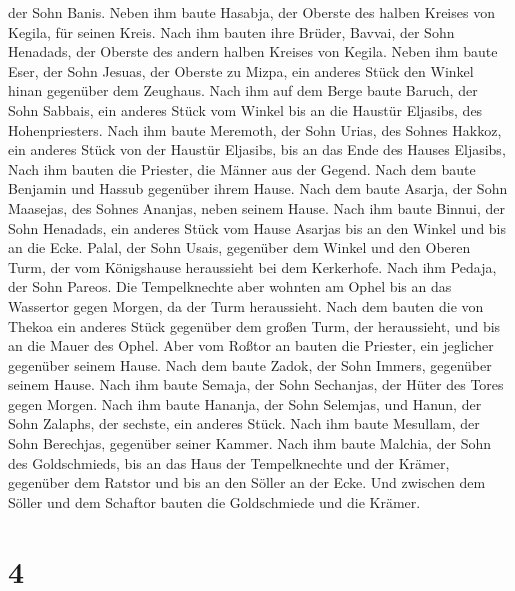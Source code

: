 der Sohn Banis. Neben ihm baute Hasabja, der Oberste des halben Kreises
von Kegila, für seinen Kreis.  Nach ihm bauten ihre Brüder,
Bavvai, der Sohn Henadads, der Oberste des andern halben Kreises von
Kegila.  Neben ihm baute Eser, der Sohn Jesuas, der Oberste
zu Mizpa, ein anderes Stück den Winkel hinan gegenüber dem Zeughaus.
 Nach ihm auf dem Berge baute Baruch, der Sohn Sabbais, ein
anderes Stück vom Winkel bis an die Haustür Eljasibs, des
Hohenpriesters.  Nach ihm baute Meremoth, der Sohn Urias,
des Sohnes Hakkoz, ein anderes Stück von der Haustür Eljasibs, bis an
das Ende des Hauses Eljasibs,  Nach ihm bauten die
Priester, die Männer aus der Gegend.  Nach dem baute
Benjamin und Hassub gegenüber ihrem Hause. Nach dem baute Asarja, der
Sohn Maasejas, des Sohnes Ananjas, neben seinem Hause. 
Nach ihm baute Binnui, der Sohn Henadads, ein anderes Stück vom Hause
Asarjas bis an den Winkel und bis an die Ecke.  Palal, der
Sohn Usais, gegenüber dem Winkel und den Oberen Turm, der vom
Königshause heraussieht bei dem Kerkerhofe. Nach ihm Pedaja, der Sohn
Pareos.  Die Tempelknechte aber wohnten am Ophel bis an das
Wassertor gegen Morgen, da der Turm heraussieht.  Nach dem
bauten die von Thekoa ein anderes Stück gegenüber dem großen Turm, der
heraussieht, und bis an die Mauer des Ophel.  Aber vom
Roßtor an bauten die Priester, ein jeglicher gegenüber seinem Hause.
 Nach dem baute Zadok, der Sohn Immers, gegenüber seinem
Hause. Nach ihm baute Semaja, der Sohn Sechanjas, der Hüter des Tores
gegen Morgen.  Nach ihm baute Hananja, der Sohn Selemjas,
und Hanun, der Sohn Zalaphs, der sechste, ein anderes Stück. Nach ihm
baute Mesullam, der Sohn Berechjas, gegenüber seiner Kammer.
 Nach ihm baute Malchia, der Sohn des Goldschmieds, bis an
das Haus der Tempelknechte und der Krämer, gegenüber dem Ratstor und bis
an den Söller an der Ecke.  Und zwischen dem Söller und dem
Schaftor bauten die Goldschmiede und die Krämer.

\hypertarget{section-3}{%
\section{4}\label{section-3}}

